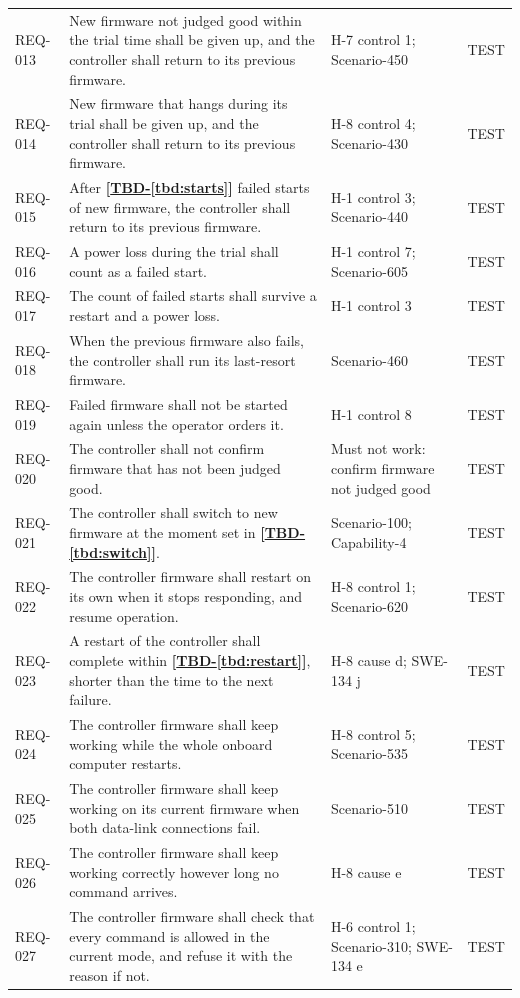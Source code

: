\documentclass[11pt,a4paper]{article}
\newcommand{\tbd}[1]{\mbox{\textbf{[\hyperref[tbd:#1]{TBD-\ref*{tbd:#1}}]}}}
\begin{document}
{\begin{xltabular}{\textwidth}{@{}l>{\raggedright\arraybackslash}X>{\raggedright\arraybackslash}p{3.2cm}>{\raggedright\arraybackslash}p{3.0cm}@{}}
REQ-013 & New firmware not judged good within the trial time shall be given up, and the controller shall return to its previous firmware. & H-7 control 1; Scenario-450 & TEST \\
REQ-014 & New firmware that hangs during its trial shall be given up, and the controller shall return to its previous firmware. & H-8 control 4; Scenario-430 & TEST \\
REQ-015 & After \tbd{starts} failed starts of new firmware, the controller shall return to its previous firmware. & H-1 control 3; Scenario-440 & TEST \\
REQ-016 & A power loss during the trial shall count as a failed start. & H-1 control 7; Scenario-605 & TEST \\
REQ-017 & The count of failed starts shall survive a restart and a power loss. & H-1 control 3 & TEST \\
REQ-018 & When the previous firmware also fails, the controller shall run its last-resort firmware. & Scenario-460 & TEST \\
REQ-019 & Failed firmware shall not be started again unless the operator orders it. & H-1 control 8 & TEST \\
REQ-020 & The controller shall not confirm firmware that has not been judged good. & Must not work: confirm firmware not judged good & TEST \\
REQ-021 & The controller shall switch to new firmware at the moment set in \tbd{switch}. & Scenario-100; Capability-4 & TEST \\
REQ-022 & The controller firmware shall restart on its own when it stops responding, and resume operation. & H-8 control 1; Scenario-620 & TEST \\
REQ-023 & A restart of the controller shall complete within \tbd{restart}, shorter than the time to the next failure. & H-8 cause d; SWE-134 j & TEST \\
REQ-024 & The controller firmware shall keep working while the whole onboard computer restarts. & H-8 control 5; Scenario-535 & TEST \\
REQ-025 & The controller firmware shall keep working on its current firmware when both data-link connections fail. & Scenario-510 & TEST \\
REQ-026 & The controller firmware shall keep working correctly however long no command arrives. & H-8 cause e & TEST \\
REQ-027 & The controller firmware shall check that every command is allowed in the current mode, and refuse it with the reason if not. & H-6 control 1; Scenario-310; SWE-134 e & TEST \\

\end{xltabular}}
\end{document}
